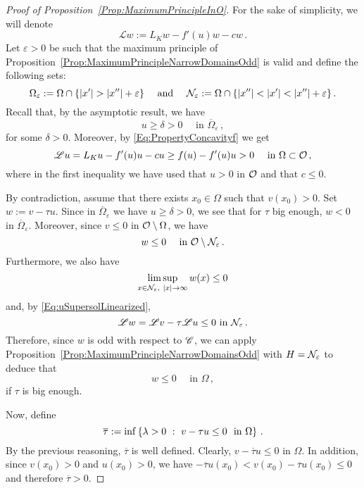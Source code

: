 \begin{proof}[Proof of Proposition~\ref{Prop:MaximumPrincipleInO}]
    


	For the sake of simplicity, we will denote 
	$$
	\mathscr{L} w := L_K w - f'(u)w - cw\,.
	$$
	Let $\varepsilon > 0$ be such that the maximum principle of Proposition~\ref{Prop:MaximumPrincipleNarrowDomainsOdd} is valid and define the following sets:
	$$
	\Omega_\varepsilon := \Omega \cap \{|x'| > |x''| + \varepsilon\}\quad \textrm{ and } \quad 
	\mathcal{N}_\varepsilon := \Omega \cap \{|x''| < |x'| < |x''| + \varepsilon\}\,.
	$$
	Recall that, by the asymptotic result, we have 
	$$
	u \geq \delta > 0 \quad \textrm{ in } \overline{\Omega}_\varepsilon\,,
	$$
	for some $\delta >0$.  Moreover, by \eqref{Eq:PropertyConcavityf} we get
	\begin{equation}
	\label{Eq:uSupersolLinearized}
	\mathscr{L} u = L_K u - f'(u)u - cu \geq f(u) - f'(u)u > 0 \quad \textrm{ in } \Omega \subset \mathcal{O}\,,
	\end{equation}
	where in the first inequality we have used that $u>0$ in $\mathcal{O}$ and that $c\leq 0$.
	
    
    By contradiction, assume that there exists $x_0\in \Omega$ such that $v(x_0)> 0$.
	Set $w := v - \tau u$. Since in $\overline{\Omega}_\varepsilon$ we have $u \geq \delta > 0$, we see that for $\tau$ big enough, $w < 0$ in $\overline{\Omega}_\varepsilon$. Moreover, since $v\leq 0$ in $\mathcal{O}\setminus\Omega$, we have 
	$$
	w \leq 0 \quad \textrm{ in } \mathcal{O} \setminus \mathcal{N}_\varepsilon\,.
	$$
	Furthermore, we also have
	$$
	\limsup_{x\in \mathcal{N}_\varepsilon, \ |x|\to \infty} w(x) \leq 0
	$$
	and, by \eqref{Eq:uSupersolLinearized},
	$$
	\mathscr{L} w = \mathscr{L} v - \tau \mathscr{L} u \leq 0 \textrm{ in } \mathcal{N}_\varepsilon\,.
	$$
	Therefore, since $w$ is odd with respect to $\mathscr{C}$, we can apply Proposition~\ref{Prop:MaximumPrincipleNarrowDomainsOdd} with $H = \mathcal{N}_\varepsilon$ to deduce that
	$$
	w \leq 0 \quad \textrm{ in } \Omega\,,
	$$
	if $\tau$ is big enough.
	
	Now, define 
	$$
	\overline{\tau}:= \inf \left \{ \lambda > 0 \ : \ v - \tau u \leq 0 \ \textrm{ in } \Omega \right \}\,.
	$$
	By the previous reasoning, $\overline{\tau}$ is well defined. Clearly, $v - \overline{\tau} u \leq 0 $ in $\Omega$. In addition, since $v(x_0)>0$ and $u(x_0)>0$, we have $-\overline{\tau} u(x_0) < v(x_0) - \overline{\tau} u (x_0) \leq 0$ and therefore $\overline{\tau} > 0$.
	

\end{proof}
